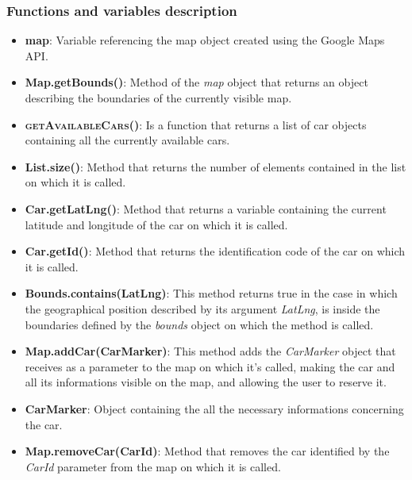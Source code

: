 \subsubsection{Functions and variables description}
\begin{itemize}
	\item \textbf{map}: Variable referencing the map object created using the Google Maps API.
	\item \textbf{Map.getBounds()}: Method of the \textit{map} object that returns an object describing
                                  the boundaries of the currently visible map.
	\item \textsc{\textbf{getAvailableCars()}}: Is a function that returns a list of car objects
                                              containing all the currently available cars.
	\item \textbf{List.size()}: Method that returns the number of elements contained in the list on which
                              it is called.
	\item \textbf{Car.getLatLng()}: Method that returns a variable containing the current latitude and
                                  longitude of the car on which it is called.
	\item \textbf{Car.getId()}: Method that returns the identification code of the car on which it is
                              called.
	\item \textbf{Bounds.contains(LatLng)}: This method returns true in the case in which the
                                          geographical position described by its argument
                                          \textit{LatLng}, is inside the boundaries defined by
                                          the \textit{bounds} object on which the method is called.
	\item \textbf{Map.addCar(CarMarker)}: This method adds the \textit{CarMarker} object that receives
                                        as a parameter to the map on which it's called, making the car
                                        and all its informations visible on the map, and allowing the
                                        user to reserve it.
	\item \textbf{CarMarker}: Object containing the all the necessary informations concerning the car.
	\item \textbf{Map.removeCar(CarId)}: Method that removes the car identified by the \textit{CarId}
                                       parameter from the map on which it is called.
\end{itemize}

